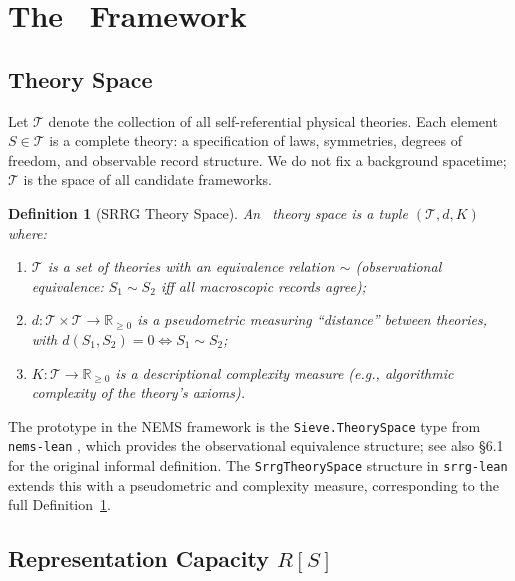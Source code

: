 \documentclass[11pt]{article}
\newtheorem{definition}[theorem]{Definition}
\theoremstyle{remark}
\newcommand{\SRRG}{\text{SRRG}}
\newcommand{\lean}[1]{%
  \penalty-100
  \begingroup
  \def\_{\textunderscore\allowbreak}%
  \texttt{#1}%
  \endgroup
}
\begin{document}
\section{The \SRRG\ Framework}
\label{sec:framework}

\subsection{Theory Space}
\label{sec:theory_space}

Let $\mathcal{T}$ denote the collection of all self-referential physical theories.
Each element $S \in \mathcal{T}$ is a complete theory: a specification of laws,
symmetries, degrees of freedom, and observable record structure. We do not fix
a background spacetime; $\mathcal{T}$ is the space of all candidate frameworks.

\begin{definition}[SRRG Theory Space]
\label{def:theory_space}
An \emph{\SRRG\ theory space} is a tuple $(\mathcal{T}, d, K)$ where:
\begin{enumerate}[leftmargin=2.5em]
\item $\mathcal{T}$ is a set of theories with an equivalence relation $\sim$
  (observational equivalence: $S_1 \sim S_2$ iff all macroscopic records agree);
\item $d: \mathcal{T} \times \mathcal{T} \to \mathbb{R}_{\geq 0}$ is a
  pseudometric measuring ``distance'' between theories, with $d(S_1, S_2) = 0
  \Leftrightarrow S_1 \sim S_2$;
\item $K: \mathcal{T} \to \mathbb{R}_{\geq 0}$ is a descriptional complexity
  measure (e.g., algorithmic complexity of the theory's axioms).
\end{enumerate}
\end{definition}

The prototype in the NEMS framework is the \lean{Sieve.TheorySpace} type from
\texttt{nems-lean} \cite{SpivackNEMSHub}, which provides the observational
equivalence structure; see also \cite{SpivackMathFoundationsSelfRef} §6.1 for the
original informal definition. The \lean{SrrgTheorySpace} structure in \texttt{srrg-lean}
extends this with a pseudometric and complexity measure, corresponding to the full
Definition~\ref{def:theory_space}.

\subsection{Representation Capacity $R[S]$}
\label{sec:rep_capacity}
\end{document}
